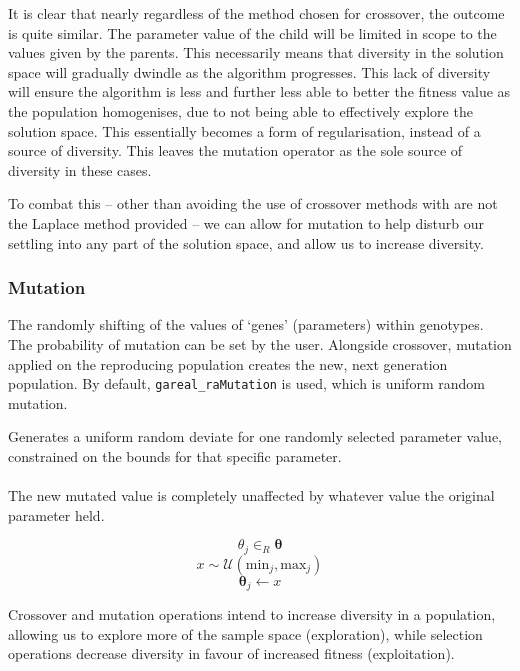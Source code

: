 \documentclass[
  a4paper,
  DIV=11,
  numbers=noendperiod]{scrartcl}
\newcommand{\B}[1]{\boldsymbol{#1}}
\newcommand{\+}{\phantom{-}}
\begin{document}
It is clear that nearly regardless of the method chosen for crossover,
the outcome is quite similar. The parameter value of the child will be
limited in scope to the values given by the parents. This necessarily
means that diversity in the solution space will gradually dwindle as the
algorithm progresses. This lack of diversity will ensure the algorithm
is less and further less able to better the fitness value as the
population homogenises, due to not being able to effectively explore the
solution space. This essentially becomes a form of regularisation,
instead of a source of diversity. This leaves the mutation operator as
the sole source of diversity in these cases.

To combat this -- other than avoiding the use of crossover methods with
are not the Laplace method provided -- we can allow for mutation to help
disturb our settling into any part of the solution space, and allow us
to increase diversity.

\subsubsection{\texorpdfstring{\textbf{Mutation}}{Mutation}}\label{mutation}

The randomly shifting of the values of `genes' (parameters) within
genotypes. The probability of mutation can be set by the user. Alongside
crossover, mutation applied on the reproducing population creates the
new, next generation population. By default, \texttt{gareal\_raMutation}
is used, which is uniform random mutation.

\begin{tcolorbox}[title=Uniform random mutation: \texttt{gareal\_raMutation()}]
Generates a uniform random deviate for one randomly selected parameter value, constrained on the bounds for that specific parameter.\\
\\
The new mutated value is completely unaffected by whatever value the original parameter held.

$$\theta_j \in_R \B \theta$$
$$x\sim \mathcal U \! \left( \text{min}_j, \text{max}_j \right)$$
$$\B \theta _j \leftarrow x$$
\end{tcolorbox}

Crossover and mutation operations intend to increase diversity in a
population, allowing us to explore more of the sample space
(exploration), while selection operations decrease diversity in favour
of increased fitness (exploitation).
\end{document}
